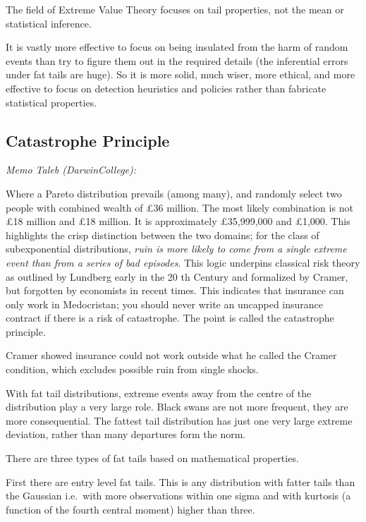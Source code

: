 \documentclass[
]{book}
\begin{document}
The field of Extreme Value Theory focuses on tail properties,
not the mean or statistical inference.

It is vastly more effective
to focus on being insulated from the harm of random events
than try to figure them out in the required details
(the inferential errors under fat tails are huge).
So it is more solid, much wiser, more ethical, and more effective to focus on
detection heuristics and policies rather than fabricate statistical properties.

\hypertarget{catastrophe-principle}{%
\subsection{Catastrophe Principle}\label{catastrophe-principle}}

\emph{Memo Taleb (DarwinCollege):}

Where a Pareto distribution
prevails (among many), and randomly select two people with
combined wealth of £36 million. The most likely combination
is not £18 million and £18 million. It is approximately
£35,999,000 and £1,000. This highlights the crisp distinction
between the two domains; for the class of subexponential
distributions, \emph{ruin is more likely to come from a single extreme
event than from a series of bad episodes}. This logic underpins
classical risk theory as outlined by Lundberg early in the 20 th
Century and formalized by Cramer, but forgotten by
economists in recent times. This indicates that insurance can
only work in Medocristan; you should never write an uncapped
insurance contract if there is a risk of catastrophe. The point
is called the catastrophe principle.

Cramer showed insurance could not work outside
what he called the Cramer condition, which excludes possible
ruin from single shocks.

With fat tail distributions, extreme events
away from the centre of the distribution play a very large
role. Black swans are not more frequent, they are more
consequential. The fattest tail distribution has just one very
large extreme deviation, rather than many departures form the
norm.

There are three types of fat tails based on mathematical properties.

First there are entry level fat tails.
This is any distribution with fatter tails than the Gaussian
i.e.~with more observations within one sigma and with
kurtosis (a function of the fourth central moment) higher than three.
\end{document}
